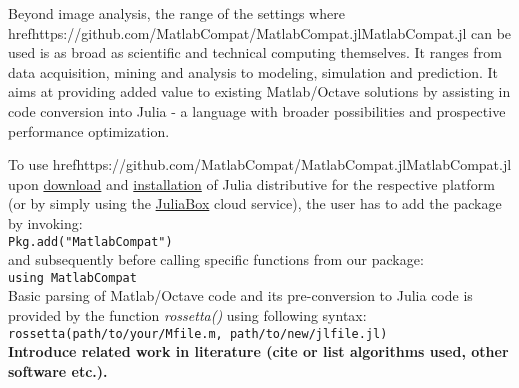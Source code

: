 Beyond image analysis, the range of the settings where href{https://github.com/MatlabCompat/MatlabCompat.jl}{MatlabCompat.jl} can be used is as broad as scientific and technical computing themselves. It ranges from data acquisition, mining and analysis to modeling, simulation and prediction. It aims at providing added value to existing Matlab/Octave solutions by assisting in code conversion into Julia - a language with broader possibilities and prospective performance optimization.

To use href{https://github.com/MatlabCompat/MatlabCompat.jl}{MatlabCompat.jl} upon \href{http://julialang.org/downloads/}{download} and \href{http://docs.julialang.org/en/release-0.3/manual/getting-started/}{installation} of Julia distributive for the respective platform (or by simply using the \href{https://www.juliabox.org/}{JuliaBox} cloud service), the user has to add the package by invoking:\\

\verb|Pkg.add("MatlabCompat")|\\

and subsequently before calling specific functions from our package:\\

\verb|using MatlabCompat|\\

Basic parsing of Matlab/Octave code and its pre-conversion to Julia code is provided by the function \textit{rossetta()} using following syntax:\\

\verb|rossetta(path/to/your/Mfile.m, path/to/new/jlfile.jl)|\\

\textbf{Introduce related work in literature (cite or list algorithms used, other software etc.).}

